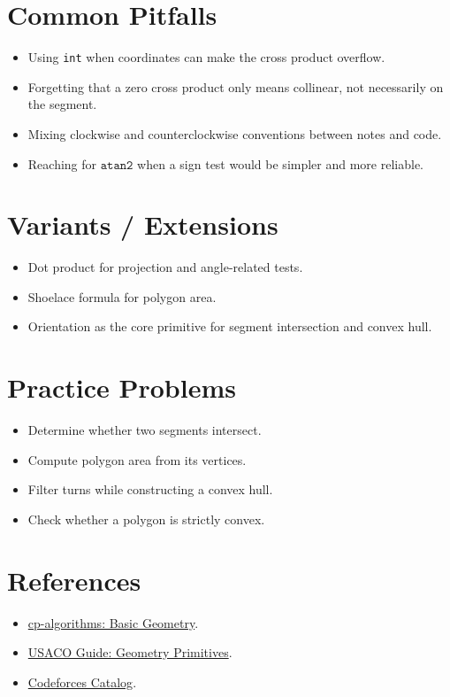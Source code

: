 \section*{Common Pitfalls}

\begin{itemize}
  \item Using \texttt{int} when coordinates can make the cross product overflow.
  \item Forgetting that a zero cross product only means collinear, not necessarily on the segment.
  \item Mixing clockwise and counterclockwise conventions between notes and code.
  \item Reaching for \(\texttt{atan2}\) when a sign test would be simpler and more reliable.
\end{itemize}

\section*{Variants / Extensions}

\begin{itemize}
  \item Dot product for projection and angle-related tests.
  \item Shoelace formula for polygon area.
  \item Orientation as the core primitive for segment intersection and convex hull.
\end{itemize}

\section*{Practice Problems}

\begin{itemize}
  \item Determine whether two segments intersect.
  \item Compute polygon area from its vertices.
  \item Filter turns while constructing a convex hull.
  \item Check whether a polygon is strictly convex.
\end{itemize}

\section*{References}

\begin{itemize}
  \item \href{https://cp-algorithms.com/geometry/basic-geometry.html}{cp-algorithms: Basic Geometry}.
  \item \href{https://usaco.guide/plat/geo-prims}{USACO Guide: Geometry Primitives}.
  \item \href{https://codeforces.com/catalog}{Codeforces Catalog}.
\end{itemize}
